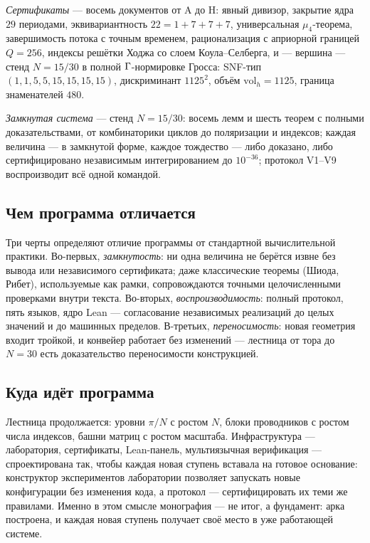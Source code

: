 \emph{Сертификаты} --- восемь документов от A до H: явный дивизор,
закрытие ядра $29$ периодами, эквивариантность $22=1+7+7+7$,
универсальная $\mu_4$-теорема, завершимость потока с точным
временем, рационализация с априорной границей $Q=256$, индексы
решётки Ходжа со слоем Коула--Селберга, и --- вершина --- стенд
$N=15/30$ в полной $\Gamma$-нормировке Гросса: SNF-тип
$(1,1,5,5,15,15,15,15)$, дискриминант $1125^2$, объём
$\mathrm{vol}_h=1125$, граница знаменателей $480$.

\emph{Замкнутая система} --- стенд $N=15/30$: восемь лемм и шесть
теорем с полными доказательствами, от комбинаторики циклов до
поляризации и индексов; каждая величина --- в замкнутой форме,
каждое тождество --- либо доказано, либо сертифицировано
независимым интегрированием до $10^{-36}$; протокол V1--V9
воспроизводит всё одной командой.

\subsection{Чем программа отличается}

Три черты определяют отличие программы от стандартной
вычислительной практики. Во-первых, \emph{замкнутость}: ни одна
величина не берётся извне без вывода или независимого сертификата;
даже классические теоремы (Шиода, Рибет), используемые как рамки,
сопровождаются точными целочисленными проверками внутри текста.
Во-вторых, \emph{воспроизводимость}: полный протокол, пять языков,
ядро Lean --- согласование независимых реализаций до целых
значений и до машинных пределов. В-третьих, \emph{переносимость}:
новая геометрия входит тройкой, и конвейер работает без изменений
--- лестница от тора до $N=30$ есть доказательство переносимости
конструкцией.

\subsection{Куда идёт программа}

Лестница продолжается: уровни $\pi/N$ с ростом $N$, блоки
проводников с ростом числа индексов, башни матриц с ростом
масштаба. Инфраструктура --- лаборатория, сертификаты, Lean-панель,
мультиязычная верификация --- спроектирована так, чтобы каждая
новая ступень вставала на готовое основание: конструктор
экспериментов лаборатории позволяет запускать новые конфигурации
без изменения кода, а протокол --- сертифицировать их теми же
правилами. Именно в этом смысле монография --- не итог, а
фундамент: арка построена, и каждая новая ступень получает своё
место в уже работающей системе.
